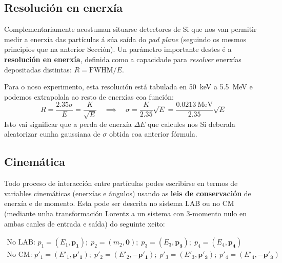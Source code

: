 \documentclass[11pt, a4paper]{article}
\newcommand{\vect}[1]{\boldsymbol{#1}}
\begin{document}
\subsection{Resolución en enerxía}
Complementariamente acostuman situarse detectores de Si que nos van permitir medir a enerxía das partículas á súa saída do \textit{pad plane} (seguindo os mesmos principios que na anterior Sección). Un parámetro importante destes é a \textbf{resolución en enerxía}, definida como a capacidade para \textit{resolver} enerxías depositadas distintas: $R = \textrm{FWHM} / E$.

Para o noso experimento, esta resolución está tabulada en \qty{50}{\keV} a \qty{5.5}{\MeV} e podemos extrapolala ao resto de enerxías coa función:
\begin{equation*}
    R = \frac{2.35 \sigma}{E} = \frac{K}{\sqrt{E}} \quad \implies \quad \sigma = \frac{K}{2.35}\sqrt{E} = \frac{\qty{0.0213}{\MeV}}{2.35} \sqrt{E}
\end{equation*}
Isto vai significar que a perda de enerxía $\Delta E$ que calcules nos Si deberala aleatorizar cunha gaussiana de $\sigma$ obtida coa anterior fórmula.

\subsection{Cinemática}
Todo proceso de interacción entre partículas podes escribirse en termos de variables cinemáticas (enerxías e ángulos) usando as \textbf{leis de conservación} de enerxía e de momento. Esta pode ser descrita no sistema LAB ou no CM (mediante unha transformación Lorentz a un sistema con 3-momento nulo en ambas canles de entrada e saída) do seguinte xeito:

\begin{equation*}
    \begin{gathered}
        \text{No LAB:  }p_1=\left(E_1, \vect{p_1}\right); \; p_2=\left(m_2, \vect{0}\right); \; p_3=\left(E_3, \vect{p_3}\right); \; p_4=\left(E_4, \vect{p_4}\right) \\
        \text{No CM:  }p'_1=\left(E'_1, \vect{p'_1}\right); \;  p'_2=\left(E'_2, -\vect{p'_1}\right); \; p'_3=\left(E'_3, \vect{p'_3}\right); \; p'_4=\left(E'_4, -\vect{p'_3}\right)
    \end{gathered}
\end{equation*}
\end{document}

